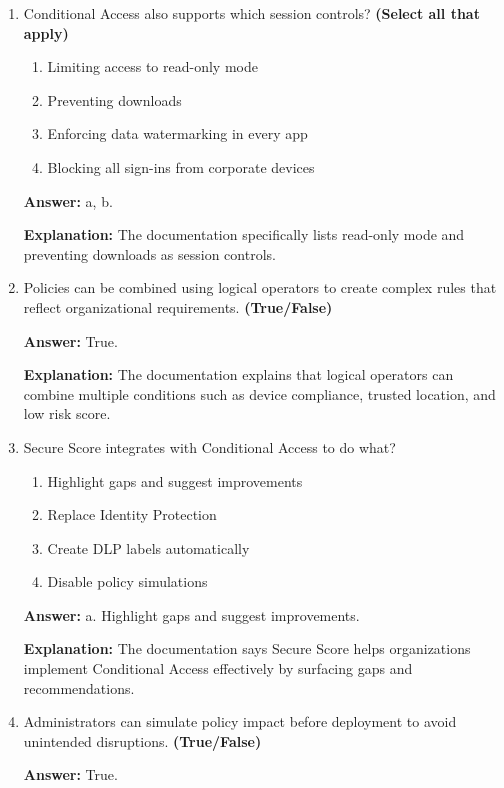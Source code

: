 \documentclass[10pt]{article}
\begin{document}
\begin{enumerate}[leftmargin=*]
\textbf{Explanation:} This is one of the exact examples given in the Conditional Access section.

\item Conditional Access also supports which session controls? \textbf{(Select all that apply)}
\begin{enumerate}[label=\alph*., leftmargin=1.5em]
\item Limiting access to read-only mode
\item Preventing downloads
\item Enforcing data watermarking in every app
\item Blocking all sign-ins from corporate devices
\end{enumerate}
\textbf{Answer:} a, b.

\textbf{Explanation:} The documentation specifically lists read-only mode and preventing downloads as session controls.

\item Policies can be combined using logical operators to create complex rules that reflect organizational requirements. \textbf{(True/False)}

\textbf{Answer:} True.

\textbf{Explanation:} The documentation explains that logical operators can combine multiple conditions such as device compliance, trusted location, and low risk score.

\item Secure Score integrates with Conditional Access to do what?
\begin{enumerate}[label=\alph*., leftmargin=1.5em]
\item Highlight gaps and suggest improvements
\item Replace Identity Protection
\item Create DLP labels automatically
\item Disable policy simulations
\end{enumerate}
\textbf{Answer:} a. Highlight gaps and suggest improvements.

\textbf{Explanation:} The documentation says Secure Score helps organizations implement Conditional Access effectively by surfacing gaps and recommendations.

\item Administrators can simulate policy impact before deployment to avoid unintended disruptions. \textbf{(True/False)}

\textbf{Answer:} True.


\end{enumerate}
\end{document}
